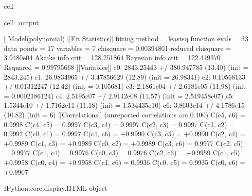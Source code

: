 \documentclass[letterpaper,10pt,english]{jupyterBook}
\begin{document}
\begin{sphinxuseclass}{cell}
\begin{sphinxVerbatimOutput}
\begin{sphinxuseclass}{cell_output}
				\begin{sphinxVerbatim}[commandchars=\\\{\}]
					[[Model]]
					Model(polynomial)
					[[Fit Statistics]]
					\PYGZsh{} fitting method   = leastsq
					\PYGZsh{} function evals   = 33
					\PYGZsh{} data points      = 17
					\PYGZsh{} variables        = 7
					chi\PYGZhy{}square         = 0.00394801
					reduced chi\PYGZhy{}square = 3.9480e\PYGZhy{}04
					Akaike info crit   = \PYGZhy{}128.251864
					Bayesian info crit = \PYGZhy{}122.419370
					R\PYGZhy{}squared          = 0.99795668
					[[Variables]]
					c0: \PYGZhy{}2843.25443 +/\PYGZhy{} 380.947785 (13.40\PYGZpc{}) (init = \PYGZhy{}2843.245)
					c1:  26.9834965 +/\PYGZhy{} 3.47856629 (12.89\PYGZpc{}) (init = 26.98341)
					c2: \PYGZhy{}0.10568133 +/\PYGZhy{} 0.01312247 (12.42\PYGZpc{}) (init = \PYGZhy{}0.105681)
					c3:  2.1861e\PYGZhy{}04 +/\PYGZhy{} 2.6181e\PYGZhy{}05 (11.98\PYGZpc{}) (init = 0.0002186124)
					c4: \PYGZhy{}2.5195e\PYGZhy{}07 +/\PYGZhy{} 2.9142e\PYGZhy{}08 (11.57\PYGZpc{}) (init = \PYGZhy{}2.519458e\PYGZhy{}07)
					c5:  1.5344e\PYGZhy{}10 +/\PYGZhy{} 1.7162e\PYGZhy{}11 (11.18\PYGZpc{}) (init = 1.534435e\PYGZhy{}10)
					c6: \PYGZhy{}3.8603e\PYGZhy{}14 +/\PYGZhy{} 4.1786e\PYGZhy{}15 (10.82\PYGZpc{}) (init = 6)
					[[Correlations]] (unreported correlations are \PYGZlt{} 0.100)
					C(c5, c6) = \PYGZhy{}0.9998
					C(c4, c5) = \PYGZhy{}0.9997
					C(c3, c4) = \PYGZhy{}0.9997
					C(c2, c3) = \PYGZhy{}0.9997
					C(c1, c2) = \PYGZhy{}0.9997
					C(c0, c1) = \PYGZhy{}0.9997
					C(c4, c6) = +0.9990
					C(c3, c5) = +0.9990
					C(c2, c4) = +0.9989
					C(c1, c3) = +0.9989
					C(c0, c2) = +0.9989
					C(c3, c6) = \PYGZhy{}0.9977
					C(c2, c5) = \PYGZhy{}0.9977
					C(c1, c4) = \PYGZhy{}0.9976
					C(c0, c3) = \PYGZhy{}0.9976
					C(c2, c6) = +0.9959
					C(c1, c5) = +0.9958
					C(c0, c4) = +0.9958
					C(c1, c6) = \PYGZhy{}0.9936
					C(c0, c5) = \PYGZhy{}0.9935
					C(c0, c6) = +0.9907
				\end{sphinxVerbatim}
				
				\begin{sphinxVerbatim}[commandchars=\\\{\}]
					\PYGZlt{}IPython.core.display.HTML object\PYGZgt{}
				\end{sphinxVerbatim}
				

\end{sphinxuseclass}
\end{sphinxVerbatimOutput}
\end{sphinxuseclass}
\end{document}
